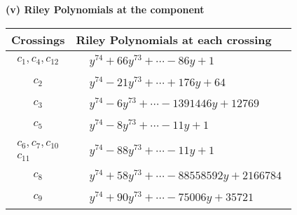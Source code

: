 \documentclass[1p]{elsarticle_modified}
\theoremstyle{definition}
\begin{document}
\newpage\renewcommand{\arraystretch}{1}
\flushleft \textbf{(v) Riley Polynomials at the component}\newline \\
\begin{tabular}{m{50pt}|m{274pt}}
Crossings & \hspace{64pt}Riley Polynomials at each crossing \\
\hline $$\begin{aligned}c_{1},c_{4},c_{12}\end{aligned}$$&$\begin{aligned}
&y^{74}+66 y^{73}+\cdots-86 y+1
\end{aligned}$\\
\hline $$\begin{aligned}c_{2}\end{aligned}$$&$\begin{aligned}
&y^{74}-21 y^{73}+\cdots+176 y+64
\end{aligned}$\\
\hline $$\begin{aligned}c_{3}\end{aligned}$$&$\begin{aligned}
&y^{74}-6 y^{73}+\cdots-1391446 y+12769
\end{aligned}$\\
\hline $$\begin{aligned}c_{5}\end{aligned}$$&$\begin{aligned}
&y^{74}-8 y^{73}+\cdots-11 y+1
\end{aligned}$\\
\hline $$\begin{aligned}c_{6},c_{7},c_{10}\\c_{11}\end{aligned}$$&$\begin{aligned}
&y^{74}-88 y^{73}+\cdots-11 y+1
\end{aligned}$\\
\hline $$\begin{aligned}c_{8}\end{aligned}$$&$\begin{aligned}
&y^{74}+58 y^{73}+\cdots-88558592 y+2166784
\end{aligned}$\\
\hline $$\begin{aligned}c_{9}\end{aligned}$$&$\begin{aligned}
&y^{74}+90 y^{73}+\cdots-75006 y+35721
\end{aligned}$\\
\hline
\end{tabular}\\~\\
\end{document}
